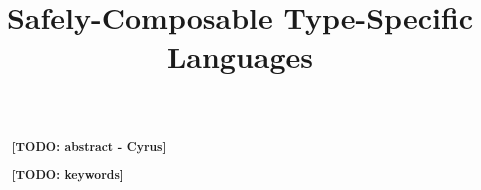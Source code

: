 \documentclass[runningheads,a4paper]{llncs}
\newcommand{\keywords}[1]{\par\addvspace\baselineskip
\noindent\keywordname\enspace\ignorespaces#1}
\newcommand{\todo}[1]{\textbf{[TODO: #1]}}
\begin{document}
\title{Safely-Composable Type-Specific Languages}
\author{~}
\institute{~}

\maketitle


\begin{abstract}
\todo{abstract - Cyrus}
%
\keywords{\todo{keywords}}
\end{abstract}












\end{document}

